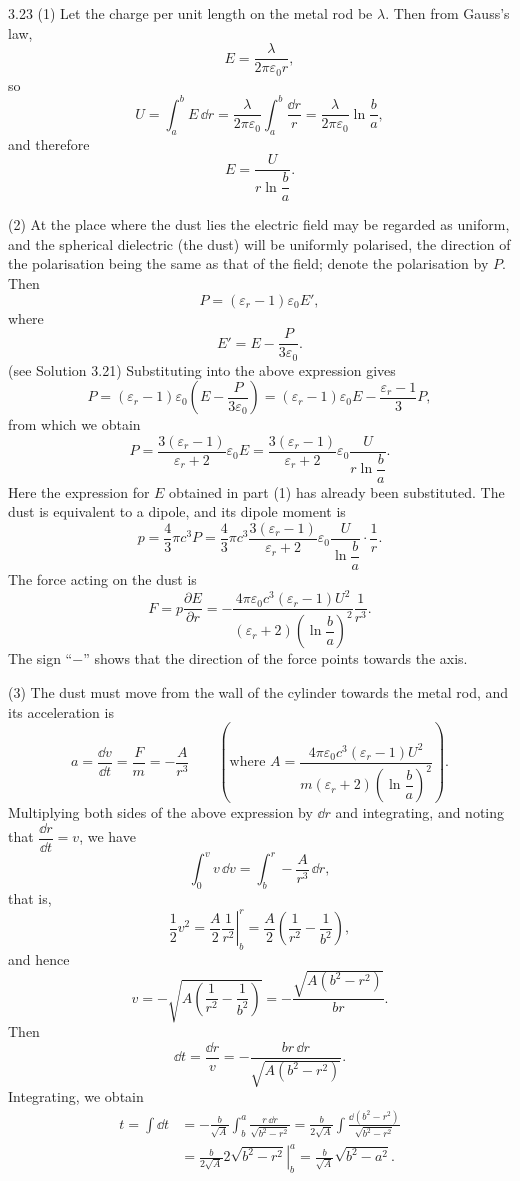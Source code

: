 \begin{solution}{3.23}
(1) Let the charge per unit length on the metal rod be $\lambda$. Then from Gauss's law,
\[
E=\frac{\lambda}{2\pi\varepsilon_0 r},
\]
so
\[
U=\int_a^b E\,\dd r=\frac{\lambda}{2\pi\varepsilon_0}\int_a^b\frac{\dd r}{r}
=\frac{\lambda}{2\pi\varepsilon_0}\ln\frac{b}{a},
\]
and therefore
\[
E=\frac{U}{r\ln\dfrac{b}{a}}.
\]

(2) At the place where the dust lies the electric field may be regarded as uniform, and the spherical dielectric (the dust) will be uniformly polarised, the direction of the polarisation being the same as that of the field; denote the polarisation by $P$. Then
\[
P=(\varepsilon_r-1)\varepsilon_0E',
\]
where
\[
E'=E-\frac{P}{3\varepsilon_0}.
\]
(see Solution 3.21) Substituting into the above expression gives
\[
P=(\varepsilon_r-1)\varepsilon_0\left(E-\frac{P}{3\varepsilon_0}\right)
=(\varepsilon_r-1)\varepsilon_0E-\frac{\varepsilon_r-1}{3}P,
\]
from which we obtain
\[
P=\frac{3(\varepsilon_r-1)}{\varepsilon_r+2}\varepsilon_0E
=\frac{3(\varepsilon_r-1)}{\varepsilon_r+2}\varepsilon_0\frac{U}{r\ln\dfrac{b}{a}}.
\]
Here the expression for $E$ obtained in part (1) has already been substituted. The dust is equivalent to a dipole, and its dipole moment is
\[
p=\frac{4}{3}\pi c^3P
=\frac{4}{3}\pi c^3\frac{3(\varepsilon_r-1)}{\varepsilon_r+2}\varepsilon_0
\frac{U}{\ln\dfrac{b}{a}}\cdot\frac{1}{r}.
\]
The force acting on the dust is
\[
F=p\frac{\partial E}{\partial r}
=-\frac{4\pi\varepsilon_0c^3(\varepsilon_r-1)U^2}
{(\varepsilon_r+2)\left(\ln\dfrac{b}{a}\right)^2}\frac{1}{r^3}.
\]
The sign ``$-$'' shows that the direction of the force points towards the axis.

(3) The dust must move from the wall of the cylinder towards the metal rod, and its acceleration is
\[
a=\frac{\dd v}{\dd t}=\frac{F}{m}=-\frac{A}{r^3}
\qquad\left(\text{where }A=\frac{4\pi\varepsilon_0c^3(\varepsilon_r-1)U^2}
{m(\varepsilon_r+2)\left(\ln\dfrac{b}{a}\right)^2}\right).
\]
Multiplying both sides of the above expression by $\dd r$ and integrating, and noting that $\dfrac{\dd r}{\dd t}=v$, we have
\[
\int_0^v v\,\dd v=\int_b^r-\frac{A}{r^3}\,\dd r,
\]
that is,
\[
\frac{1}{2}v^2=\frac{A}{2}\left.\frac{1}{r^2}\right|_b^r
=\frac{A}{2}\left(\frac{1}{r^2}-\frac{1}{b^2}\right),
\]
and hence
\[
v=-\sqrt{A\left(\frac{1}{r^2}-\frac{1}{b^2}\right)}
=-\frac{\sqrt{A(b^2-r^2)}}{br}.
\]
Then
\[
\dd t=\frac{\dd r}{v}=-\frac{br\,\dd r}{\sqrt{A(b^2-r^2)}}.
\]
Integrating, we obtain
\begin{align*}
t=\int\dd t&=-\frac{b}{\sqrt{A}}\int_b^a\frac{r\,\dd r}{\sqrt{b^2-r^2}}
=\frac{b}{2\sqrt{A}}\int\frac{\dd(b^2-r^2)}{\sqrt{b^2-r^2}}\\
&=\frac{b}{2\sqrt{A}}\left.2\sqrt{b^2-r^2}\right|_b^a
=\frac{b}{\sqrt{A}}\sqrt{b^2-a^2}.
\end{align*}
\end{solution}

